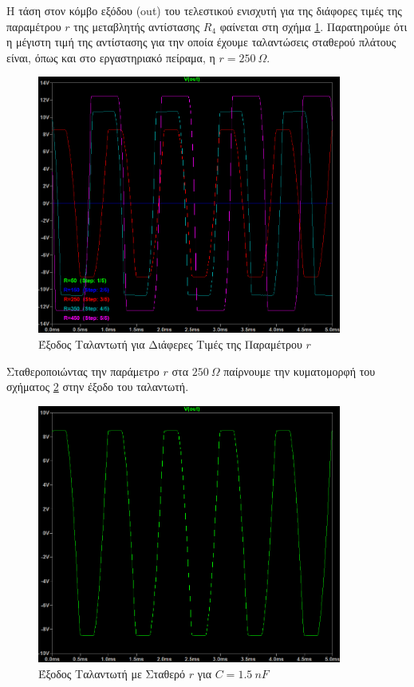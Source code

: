 \documentclass[11pt,a4paper,twoside,onecolumn,openright,final]{memoir}
\begin{document}
Η τάση στον κόμβο εξόδου (out) του τελεστικού ενισχυτή για της διάφορες τιμές της παραμέτρου \(r\) της μεταβλητής αντίστασης \(R_4\) φαίνεται στη σχήμα \ref{fig:ex5plot1}. Παρατηρούμε ότι η μέγιστη τιμή της αντίστασης για την οποία έχουμε ταλαντώσεις σταθερού πλάτους είναι, όπως και στο εργαστηριακό πείραμα, η \(r = 250 \ \Omega\).

\begin{figure}[h]
\centerfloat%
\includegraphics[width=10.0cm]{figures/exercise5plot1.png}
\caption{Έξοδος Ταλαντωτή για Διάφερες Τιμές της Παραμέτρου \(r\)}\label{fig:ex5plot1}
\end{figure}

Σταθεροποιώντας την παράμετρο \(r\) στα \(250 \ \Omega\) παίρνουμε την κυματομορφή του σχήματος \ref{fig:ex5plot2} στην έξοδο του ταλαντωτή.

\begin{figure}[h]
\centerfloat%
\includegraphics[width=10.0cm]{figures/exercise5plot2.png}
\caption{Έξοδος Ταλαντωτή με Σταθερό \(r\) για \(C = 1.5\ nF\) }\label{fig:ex5plot2}
\end{figure}
\end{document}
